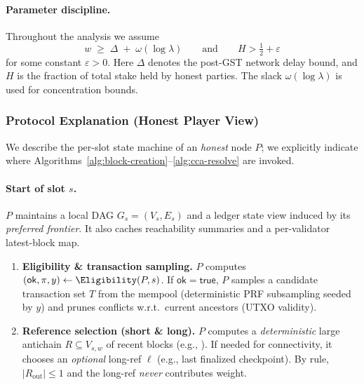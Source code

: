 {\paragraph{Parameter discipline.} Throughout the analysis we assume
\begin{equation}
\label{eq:base-params}
w \;\ge\; \Delta \;+\; \omega(\log\lambda) \qquad\text{and}\qquad 
H>\tfrac{1}{2}+\varepsilon
\end{equation}
for some constant $\varepsilon>0$. Here $\Delta$ denotes the post-GST network delay bound, and $H$ is the fraction of total stake held by honest parties. The slack $\omega(\log\lambda)$ is used for concentration bounds.

\subsubsection{Protocol Explanation (Honest Player View)}
\label{subsec:base-walkthrough}
We describe the per-slot state machine of an \emph{honest} node $P$; we explicitly indicate where Algorithms~\ref{alg:block-creation}–\ref{alg:cca-resolve} are invoked. 


\paragraph{Start of slot $s$.}
$P$ maintains a local DAG $G_s=(V_s,E_s)$ and a ledger state view induced by its \emph{preferred frontier}. It also caches reachability summaries and a per-validator latest-block map.

\begin{enumerate}
  \item \textbf{Eligibility \& transaction sampling.}
  $P$ computes $(\mathsf{ok},\pi,y)\leftarrow\Eligibility(P,s)$. If $\mathsf{ok}=\textsf{true}$, $P$ samples a candidate transaction set $T$ from the mempool (deterministic PRF subsampling seeded by $y$) and prunes conflicts w.r.t.\ current ancestors (UTXO validity).

  \item \textbf{Reference selection (short \& long).}
  $P$ computes a \emph{deterministic} large antichain $R\subseteq V_{s,w}$ of recent blocks (e.g., \GreedyAntichain). If needed for connectivity, it chooses an \emph{optional} long-ref $\ell$ (e.g., last finalized checkpoint). By rule, $|R_{\text{out}}|\le1$ and the long-ref \emph{never} contributes weight.


\end{enumerate}}
